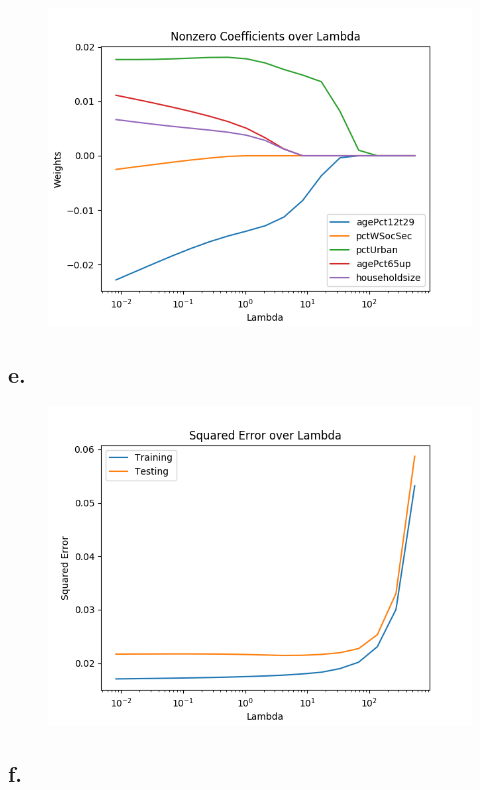 \documentclass{article}
\newcommand{\1}{\mathbf{1}}
\begin{document}
{\begin{figure}[ht!]
  \centering
  \includegraphics[width=150mm]{../hw2-code/results/a5_d.png}
\end{figure}

\newpage

\subsection*{e.}

\begin{figure}[ht!]
  \centering
  \includegraphics[width=150mm]{../hw2-code/results/a5_e.png}
\end{figure}

\subsection*{f.}

}
\end{document}
